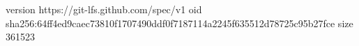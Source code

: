 version https://git-lfs.github.com/spec/v1
oid sha256:64ff4ed9caec73810f1707490ddf0f7187114a2245f635512d78725c95b27fce
size 361523

